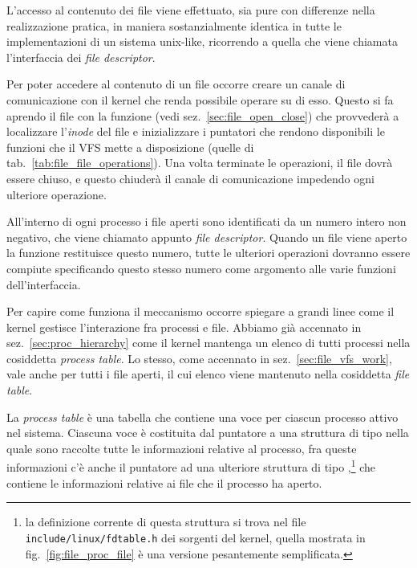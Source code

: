 
L'accesso al contenuto dei file viene effettuato, sia pure con differenze
nella realizzazione pratica, in maniera sostanzialmente identica in tutte le
implementazioni di un sistema unix-like, ricorrendo a quella che viene
chiamata l'interfaccia dei \textit{file descriptor}.

Per poter accedere al contenuto di un file occorre creare un canale di
comunicazione con il kernel che renda possibile operare su di esso. Questo si
fa aprendo il file con la funzione  (vedi
sez.~\ref{sec:file_open_close}) che provvederà a localizzare l'\textit{inode}
del file e inizializzare i puntatori che rendono disponibili le funzioni che
il VFS mette a disposizione (quelle di
tab.~\ref{tab:file_file_operations}). Una volta terminate le operazioni, il 
file dovrà essere chiuso, e questo chiuderà il canale di comunicazione
impedendo ogni ulteriore operazione.

All'interno di ogni processo i file aperti sono identificati da un numero
intero non negativo, che viene chiamato appunto \textit{file descriptor}.
Quando un file viene aperto la funzione  restituisce questo numero,
tutte le ulteriori operazioni dovranno essere compiute specificando questo
stesso numero come argomento alle varie funzioni dell'interfaccia.


Per capire come funziona il meccanismo occorre spiegare a grandi linee come il
kernel gestisce l'interazione fra processi e file.  Abbiamo già accennato in
sez.~\ref{sec:proc_hierarchy} come il kernel mantenga un elenco di tutti
processi nella cosiddetta \textit{process table}. Lo stesso, come accennato in
sez.~\ref{sec:file_vfs_work}, vale anche per tutti i file aperti, il cui
elenco viene mantenuto nella cosiddetta \textit{file table}.

La \textit{process table} è una tabella che contiene una voce per ciascun
processo attivo nel sistema. Ciascuna voce è costituita dal puntatore a una
struttura di tipo  nella quale sono raccolte tutte le
informazioni relative al processo, fra queste informazioni c'è anche il
puntatore ad una ulteriore struttura di tipo
,\footnote{la definizione corrente di questa struttura
  si trova nel file \texttt{include/linux/fdtable.h} dei sorgenti del kernel,
  quella mostrata in fig.~\ref{fig:file_proc_file} è una versione pesantemente
  semplificata.} che contiene le informazioni relative ai file che il processo
ha aperto.

